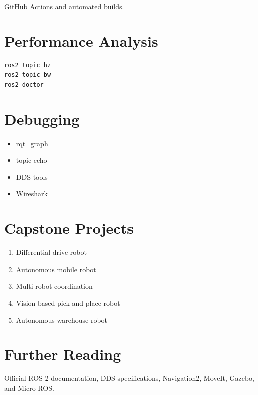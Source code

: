 \documentclass[11pt,oneside]{book}
\begin{document}
GitHub Actions and automated builds.

\chapter{Performance Analysis}

\begin{verbatim}
ros2 topic hz
ros2 topic bw
ros2 doctor
\end{verbatim}

\chapter{Debugging}

\begin{itemize}
\item rqt_graph
\item topic echo
\item DDS tools
\item Wireshark
\end{itemize}

\backmatter

\chapter{Capstone Projects}

\begin{enumerate}
\item Differential drive robot
\item Autonomous mobile robot
\item Multi-robot coordination
\item Vision-based pick-and-place robot
\item Autonomous warehouse robot
\end{enumerate}

\chapter{Further Reading}

Official ROS 2 documentation, DDS specifications,
Navigation2, MoveIt, Gazebo, and Micro-ROS.
\end{document}
